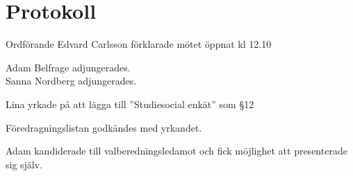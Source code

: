 \documentclass[10pt]{article}
\def\mo{Edvard Carlsson}
\begin{document}
\section*{Protokoll}
\begin{paragrafer}
Ordförande {\mo} förklarade mötet öppnat kl 12.10

{\valavmo}

{\valavms}

{\valavj}

{\tosg}

 
Adam Belfrage adjungerades. \\
Sanna Nordberg adjungerades.




Lina yrkade på att lägga till ''Studiesocial enkät'' som \S12

Föredragningslistan godkändes med yrkandet.


\begin{fyllnadsval} %


Adam kandiderade till valberedningsledamot och fick möjlighet att presenterade sig själv. 


\end{fyllnadsval}
\end{paragrafer}
\end{document}
